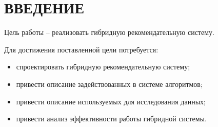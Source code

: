 \section*{ВВЕДЕНИЕ}

Цель работы -- реализовать гибридную рекомендательную систему.

Для достижения поставленной цели потребуется:
\begin{itemize}
	\item спроектировать гибридную рекомендательную систему;
	\item привести описание задействованных в системе алгоритмов;
	\item привести описание используемых для исследования данных;
	\item привести анализ эффективности работы гибридной системы.
\end{itemize}

\pagebreak
